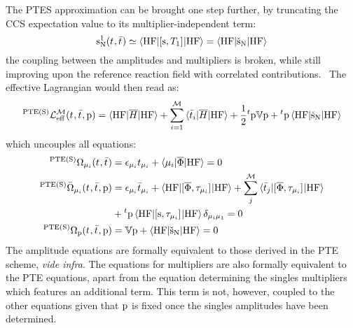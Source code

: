 The \acrshort{PTES} approximation can be brought one step further, by
truncating the \acrshort{CCS} expectation value to its multiplier-independent
term:
\begin{equation}
  \mathrm{s}_{\mathrm{N}}^1(t_{}, \bar{t}_{})
  \simeq
  \braket{\mathrm{HF} | [ \mathrm{s}, T_1 ]^{} | \mathrm{HF}}
  =
  \braket{\mathrm{HF} | \check{\mathrm{s}}_{\mathrm{N}} | \mathrm{HF}}
\end{equation}
the coupling between the amplitudes and multipliers is broken, while
still improving upon the reference reaction field with correlated
contributions.~\autocite{Caricato2011-tx}
The effective Lagrangian would then read as:
\begin{equation}\label{eq:pte-s-cc}
  {}^{\mathrm{PTE(S)}}\mathcal{L}^\mathcal{M}_\mathrm{eff}(t_{}, \bar{t}_{}, \mathrm{p}) =
  \braket{\mathrm{HF} | \overline{H} | \mathrm{HF}}
  + \sum_{i=1}^{\mathcal{M}}\braket{\bar{t}_{i} | \overline{H} | \mathrm{HF}}
  + \frac{1}{2}{}^t\mathrm{p}\mathbb{V}\mathrm{p} + {}^t\mathrm{p}\braket{\mathrm{HF} | \check{\mathrm{s}}_{\mathrm{N}} | \mathrm{HF}}
\end{equation}
which uncouples all equations:
\begin{subequations}
  \begin{align}
  {}^{\mathrm{PTE(S)}}\Omega_{\mu_i}(t_{}, \bar{t}_{})  &=
   \epsilon_{\mu_i}t_{\mu_i} + \braket{\mu_i | \overline{\Phi} | \mathrm{HF}}
   = 0 \\
   {}^{\mathrm{PTE(S)}}\bar{\Omega}_{\mu_i}(t_{}, \bar{t}_{}, \mathrm{p}) &=
    \epsilon_{\mu_i}\bar{t}_{\mu_i} +
    \braket{\mathrm{HF} | [ \overline{\Phi}, \tau_{\mu_i} ]^{} | \mathrm{HF}} +
    \sum_{j}^{\mathcal{M}}\braket{\bar{t}_{j} |
    [ \overline{\Phi}, \tau_{\mu_i} ]^{} | \mathrm{HF}}
    \nonumber \\
    &+
    {}^t\mathrm{p}\braket{\mathrm{HF} | [ \mathrm{s}, \tau_{\mu_i} ]^{} | \mathrm{HF}}\delta_{\mu_i\mu_1}
    = 0 \\
    {}^{\mathrm{PTE(S)}}\Omega_{\mathrm{p}}(t_{}, \bar{t}_{}, \mathrm{p})
    &=
    \mathbb{V}\mathrm{p} + \braket{\mathrm{HF} | \check{\mathrm{s}}_{\mathrm{N}} | \mathrm{HF}} = 0
  \end{align}
\end{subequations}
The amplitude equations are formally equivalent to those derived in the
\acrshort{PTE} scheme, \emph{vide infra}. The equations for multipliers are also formally
equivalent to the \acrshort{PTE} equations, apart from the equation
determining the singles multipliers which features an additional term.
This term is not, however, coupled to the other equations given that
$\mathrm{p}$ is fixed once the singles amplitudes have been determined.


